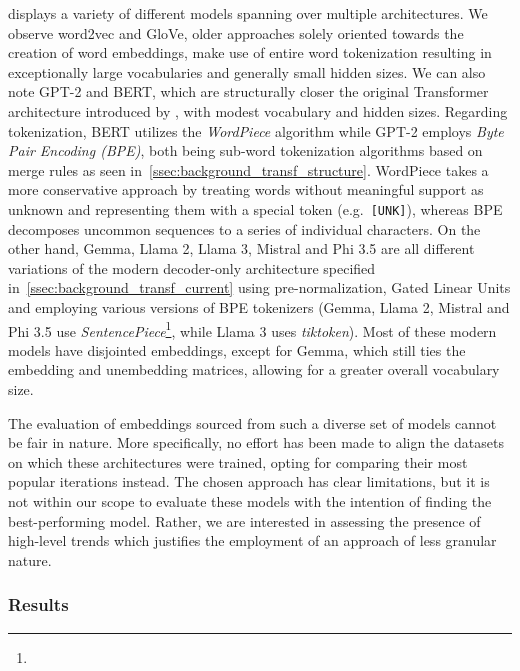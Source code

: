  displays a variety of different models spanning over multiple architectures.
We observe word2vec and GloVe, older approaches solely oriented towards the creation of word embeddings, make use of entire word tokenization resulting in exceptionally large vocabularies and generally small hidden sizes.
We can also note GPT-2 and BERT, which are structurally closer the original Transformer architecture introduced by \citet{vaswani2017}, with modest vocabulary and hidden sizes.
Regarding tokenization, BERT utilizes the \emph{WordPiece} algorithm while GPT-2 employs \emph{Byte Pair Encoding (BPE)}, both being sub-word tokenization algorithms based on merge rules as seen in~\cref{ssec:background_transf_structure}.
WordPiece takes a more conservative approach by treating words without meaningful support as unknown and representing them with a special token (e.g.\ \texttt{[UNK]}), whereas BPE decomposes uncommon sequences to a series of individual characters.
On the other hand, Gemma, Llama 2, Llama 3, Mistral and Phi 3.5 are all different variations of the modern decoder-only architecture specified in~\cref{ssec:background_transf_current} using pre-normalization, Gated Linear Units and employing various versions of BPE tokenizers (Gemma, Llama 2, Mistral and Phi 3.5 use \emph{SentencePiece}\footnote{}, while Llama 3 uses \emph{tiktoken}\footnotemark).
Most of these modern models have disjointed embeddings, except for Gemma, which still ties the embedding and unembedding matrices, allowing for a greater overall vocabulary size.


The evaluation of embeddings sourced from such a diverse set of models cannot be fair in nature.
More specifically, no effort has been made to align the datasets on which these architectures were trained, opting for comparing their most popular iterations instead.
The chosen approach has clear limitations, but it is not within our scope to evaluate these models with the intention of finding the best-performing model.
Rather, we are interested in assessing the presence of high-level trends which justifies the employment of an approach of less granular nature.

\subsubsection{Results}\label{sssec:exp_emb_exp1_results}


